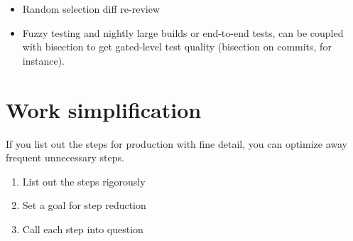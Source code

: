 \documentclass{article}
\begin{document}
\begin{itemize}
\item Random selection diff re-review
\item Fuzzy testing and nightly large builds or end-to-end tests, can be coupled with bisection to get gated-level test quality (bisection on commits, for instance).
\end{itemize}

\section{Work simplification}

If you list out the steps for production with fine detail, you can optimize away frequent unnecessary steps.

\begin{enumerate}
\item List out the steps rigorously
\item Set a goal for step reduction
\item Call each step into question
\end{enumerate}

{}

\end{document}
